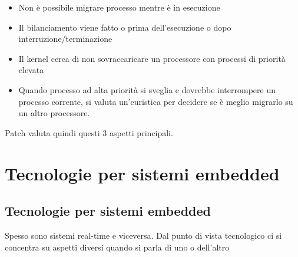 \documentclass[12pt, oneside]{extbook}
\begin{document}
\begin{itemize}
\item Non è possibile migrare processo mentre è in esecuzione
\item Il bilanciamento viene fatto o prima dell'esecuzione o dopo interruzione/terminazione
\item Il kernel cerca di non sovraccaricare un processore con processi di priorità elevata
\item Quando processo ad alta priorità si sveglia e dovrebbe interrompere un processo corrente, si valuta un'euristica per decidere se è meglio migrarlo su un altro processore.
\end{itemize}
Patch valuta quindi questi 3 aspetti principali.
\chapter{Tecnologie per sistemi embedded}
\section{Tecnologie per sistemi embedded}
Spesso sono sistemi real-time e viceversa. Dal punto di vista tecnologico ci si concentra su aspetti diversi quando si parla di uno o dell'altro
\end{document}
